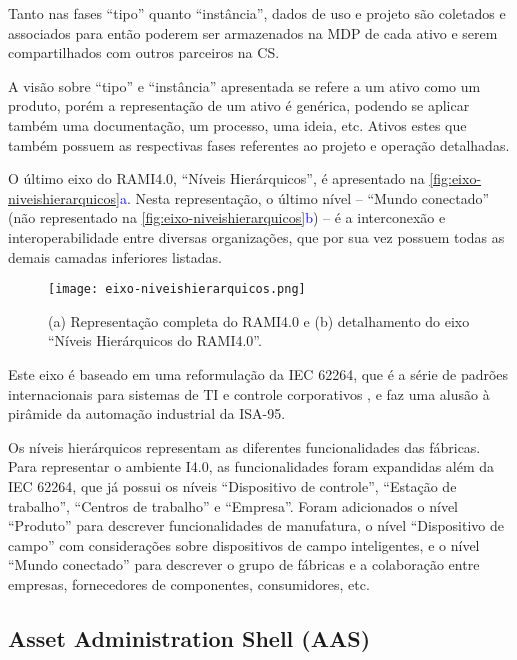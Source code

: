 Tanto nas fases ``tipo'' quanto ``instância'', dados de uso e projeto são coletados e associados para então poderem ser armazenados na MDP de cada ativo e serem compartilhados com outros parceiros na CS.

A visão sobre ``tipo'' e ``instância'' apresentada se refere a um ativo como um produto, porém a representação de um ativo é genérica, podendo se aplicar também uma documentação, um processo, uma ideia, etc. Ativos estes que também possuem as respectivas fases referentes ao projeto e operação detalhadas.

O último eixo do RAMI4.0, ``Níveis Hierárquicos'', é apresentado na \autoref{fig:eixo-niveishierarquicos}\textcolor{blue}{a}. Nesta representação, o último nível -- ``Mundo conectado'' (não representado na \autoref{fig:eixo-niveishierarquicos}\textcolor{blue}{b}) -- é a interconexão e interoperabilidade entre diversas organizações, que por sua vez possuem todas as demais camadas inferiores listadas.

\begin{figure}[htb]
	\centering
	\texttt{[image: eixo-niveishierarquicos.png]}
	\caption{(a) Representação completa do RAMI4.0 e (b) detalhamento do eixo ``Níveis Hierárquicos do RAMI4.0''.}
	\label{fig:eixo-niveishierarquicos}
\end{figure}

Este eixo é baseado em uma reformulação da IEC 62264, que é a série de padrões internacionais para sistemas de TI e controle corporativos \cite{hankel2015rami}, e faz uma alusão à pirâmide da automação industrial da ISA-95.

Os níveis hierárquicos representam as diferentes funcionalidades das fábricas. Para representar o ambiente I4.0, as funcionalidades foram expandidas além da IEC 62264, que já possui os níveis ``Dispositivo de controle'', ``Estação de trabalho'', ``Centros de trabalho'' e ``Empresa''. Foram adicionados o nível ``Produto'' para descrever funcionalidades de manufatura, o nível ``Dispositivo de campo'' com considerações sobre dispositivos de campo inteligentes, e o nível ``Mundo conectado'' para descrever o grupo de fábricas e a colaboração entre empresas, fornecedores de componentes, consumidores, etc.

\subsection{Asset Administration Shell (AAS)}


